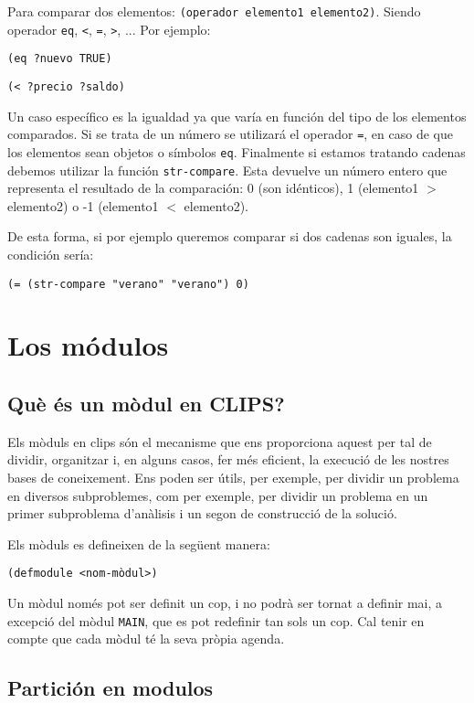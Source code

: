 \documentclass[11pt,svgnames]{scrbook}
\begin{document}
Para comparar dos elementos: \texttt{(operador elemento1 elemento2)}. Siendo
operador \texttt{eq}, \texttt{<}, \texttt{=}, \texttt{>}, ...
Por ejemplo:
\medskip

\texttt{(eq ?nuevo TRUE)}

\texttt{(< ?precio ?saldo)}
\medskip

Un caso específico es la igualdad ya que varía en función del tipo de los
elementos comparados. Si se trata de un número se utilizará el operador
\texttt{=}, en caso de que los elementos sean objetos o símbolos \texttt{eq}.
Finalmente si estamos tratando cadenas debemos utilizar la función
\texttt{str-compare}. Esta devuelve un número entero que representa el resultado
de la comparación: 0 (son idénticos), 1 (elemento1 $>$ elemento2) o -1
(elemento1 $<$ elemento2).

De esta forma, si por ejemplo queremos comparar si dos cadenas son iguales, la
condición sería:
\medskip

\texttt{(= (str-compare "verano" "verano") 0)}



\section{Los módulos}

\subsection{Què és un mòdul en CLIPS?}


Els mòduls en clips són el mecanisme que ens proporciona aquest per tal de dividir, organitzar i, en alguns casos, fer més eficient, la execució de les nostres bases de coneixement. Ens poden ser útils, per exemple, per dividir un problema en diversos subproblemes, com per exemple, per dividir un problema en un primer subproblema d'anàlisis i un segon de construcció de la solució.

Els mòduls es defineixen de la següent manera:
\medskip

\texttt{(defmodule <nom-mòdul>)}
\medskip

Un mòdul només pot ser definit un cop, i no podrà ser tornat a definir mai, a excepció del mòdul
\texttt{MAIN}, que es pot redefinir tan sols un cop. Cal tenir en compte que cada mòdul té la seva
pròpia agenda.

\subsection{Partición en modulos}
\end{document}
